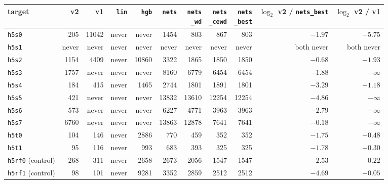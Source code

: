 \begin{tabular}{lrrrrrrrrrr}
\toprule
target & v2 & v1 & \texttt{lin} & \texttt{hgb} & \texttt{nets} & \hd{\texttt{nets}\\\texttt{\_wd}} & \hd{\texttt{nets}\\\texttt{\_cewd}} & \hd{\texttt{nets}\\\texttt{\_best}} & \hd{$\log_2$ v2 /\\\texttt{nets\_best}} & \hd{$\log_2$\\v2 / v1}\\
\midrule
\texttt{h5s0} & 205 & 11042 & never & never & 1454 & 803 & 867 & 803 & $-1.97$ & $-5.75$\\
\texttt{h5s1} & never & never & never & never & never & never & never & never & both never & both never\\
\texttt{h5s2} & 1154 & 4409 & never & 10860 & 3322 & 1865 & 1850 & 1850 & $-0.68$ & $-1.93$\\
\texttt{h5s3} & 1757 & never & never & never & 8160 & 6779 & 6454 & 6454 & $-1.88$ & $-\infty$\\
\texttt{h5s4} & 184 & 415 & never & 1465 & 2744 & 1801 & 1891 & 1801 & $-3.29$ & $-1.18$\\
\texttt{h5s5} & 421 & never & never & never & 13832 & 13610 & 12254 & 12254 & $-4.86$ & $-\infty$\\
\texttt{h5s6} & 573 & never & never & never & 6227 & 4771 & 3963 & 3963 & $-2.79$ & $-\infty$\\
\texttt{h5s7} & 6760 & never & never & never & 13863 & 12878 & 7641 & 7641 & $-0.18$ & $-\infty$\\
\texttt{h5t0} & 104 & 146 & never & 2886 & 770 & 459 & 352 & 352 & $-1.75$ & $-0.48$\\
\texttt{h5t1} & 95 & 116 & never & 993 & 683 & 393 & 325 & 325 & $-1.78$ & $-0.30$\\
\midrule
\texttt{h5rf0} (control) & 268 & 311 & never & 2658 & 2673 & 2056 & 1547 & 1547 & $-2.53$ & $-0.22$\\
\texttt{h5rf1} (control) & 98 & 101 & never & 9281 & 3352 & 2859 & 2512 & 2512 & $-4.69$ & $-0.05$\\
\bottomrule
\end{tabular}
